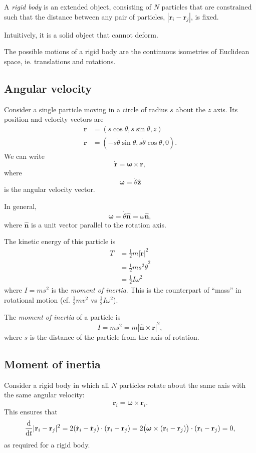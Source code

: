 \documentclass[a4paper]{article}
\begin{document}
\begin{defi}
  A \emph{rigid body} is an extended object, consisting of $N$ particles that are constrained such that the distance between any pair of particles, $|\mathbf{r}_i - \mathbf{r}_j|$, is fixed.
\end{defi}
Intuitively, it is a solid object that cannot deform.

The possible motions of a rigid body are the continuous isometries of Euclidean space, ie. translations and rotations.
\subsection{Angular velocity}
Consider a single particle moving in a circle of radius $s$ about the $z$ axis. Its position and velocity vectors are
\begin{align*}
  \mathbf{r} &= (s\cos \theta, s\sin \theta, z)\\
  \dot{\mathbf{r}} &= (-s \dot{\theta}\sin \theta, s\dot{\theta}\cos \theta, 0).
\end{align*}
We can write
\[
  \dot{\mathbf{r}} = \boldsymbol\omega\times \mathbf{r},
\]
where
\[
  \boldsymbol\omega = \dot{\theta}\hat{\mathbf{z}}
\]
is the angular velocity vector.

In general,
\[
  \boldsymbol\omega = \dot{\theta} \hat{\mathbf{n}} = \omega\hat{\mathbf{n}},
\]
where $\hat{\mathbf{n}}$ is a unit vector parallel to the rotation axis.

The kinetic energy of this particle is
\begin{align*}
  T &= \frac{1}{2}m|\dot{\mathbf{r}}|^2\\
  &= \frac{1}{2}m s^2 \dot{\theta}^2\\
  &= \frac{1}{2}I \omega^2
\end{align*}
where $I = ms^2$ is the \emph{moment of inertia}. This is the counterpart of ``mass'' in rotational motion (cf. $\frac{1}{2}mv^2$ vs $\frac{1}{2}I\omega^2$).
\begin{defi}
  The \emph{moment of inertia} of a particle is
  \[
    I = ms^2 = m|\hat{\mathbf{n}}\times \mathbf{r}|^2,
  \]
  where $s$ is the distance of the particle from the axis of rotation.
\end{defi}
\subsection{Moment of inertia}
Consider a rigid body in which all $N$ particles rotate about the same axis with the same angular velocity:
\[
  \dot{\mathbf{r}}_i = \boldsymbol\omega\times \mathbf{r}_i.
\]
This ensures that
\[
  \frac{\mathrm{d} }{\mathrm{d} t}|\mathbf{r}_i - \mathbf{r}_j|^2 = 2(\dot{\mathbf{r}}_i - \dot{\mathbf{r}}_j)\cdot (\mathbf{r}_i - \mathbf{r}_j) = 2\big(\boldsymbol\omega\times (\mathbf{r}_i - \mathbf{r}_j)\big) \cdot (\mathbf{r}_i - \mathbf{r}_j) = 0,
\]
as required for a rigid body.
\end{document}
